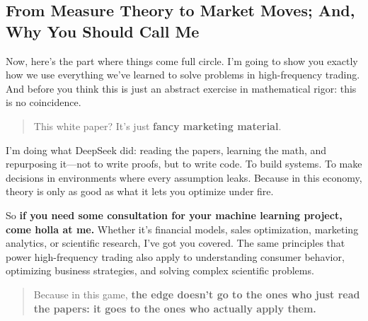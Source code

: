 \subsection{From Measure Theory to Market Moves; And, Why You Should Call Me}

Now, here’s the part where things come full circle. I’m going to show you exactly how we use everything we've learned to solve problems in high-frequency trading. And before you think this is just an abstract exercise in mathematical rigor: this is no coincidence.

\begin{quote}
This white paper? It’s just \textbf{fancy marketing material}. 
\end{quote}

I’m doing what DeepSeek did: reading the papers, learning the math, and repurposing it—not to write proofs, but to write code. To build systems. To make decisions in environments where every assumption leaks. Because in this economy, theory is only as good as what it lets you optimize under fire.

So \textbf{if you need some consultation for your machine learning project, come holla at me.} Whether it’s financial models, sales optimization, marketing analytics, or scientific research, I’ve got you covered. The same principles that power high-frequency trading also apply to understanding consumer behavior, optimizing business strategies, and solving complex scientific problems.

\begin{quote}
Because in this game, \textbf{the edge doesn’t go to the ones who just read the papers: it goes to the ones who actually apply them.}
\end{quote}